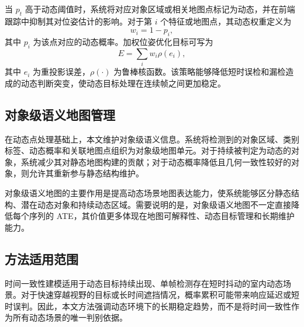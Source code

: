 当 \(p_t\) 高于动态阈值时，系统将对应对象区域或相关地图点标记为动态，并在前端跟踪中抑制其对位姿估计的影响。对于第 \(i\) 个特征或地图点，其动态权重定义为
\begin{equation}
w_i=1-p_i ,
\label{eq:dynamic_weight}
\end{equation}
其中 \(p_i\) 为该点对应的动态概率。加权位姿优化目标可写为
\begin{equation}
E=\sum_i w_i\rho(e_i),
\label{eq:weighted_objective}
\end{equation}
其中 \(e_i\) 为重投影误差，\(\rho(\cdot)\) 为鲁棒核函数。该策略能够降低短时误检和漏检造成的动态判断突变，使动态目标处理在连续帧之间更加稳定。

\subsection{对象级语义地图管理}

在动态点处理基础上，本文维护对象级语义信息。系统将检测到的对象区域、类别标签、动态概率和关联地图点组织为对象级地图单元。对于持续被判定为动态的对象，系统减少其对静态地图构建的贡献；对于动态概率降低且几何一致性较好的对象，则允许其重新参与静态结构维护。

对象级语义地图的主要作用是提高动态场景地图表达能力，使系统能够区分静态结构、潜在动态对象和持续动态区域。需要说明的是，对象级语义地图不一定直接降低每个序列的 ATE，其价值更多体现在地图可解释性、动态目标管理和长期维护能力。

\subsection{方法适用范围}

时间一致性建模适用于动态目标持续出现、单帧检测存在短时抖动的室内动态场景。对于快速穿越视野的目标或长时间遮挡情况，概率累积可能带来响应延迟或短时误判。因此，本文方法强调动态环境下的长期稳定趋势，而不是将时间一致性作为所有动态场景的唯一判别依据。

